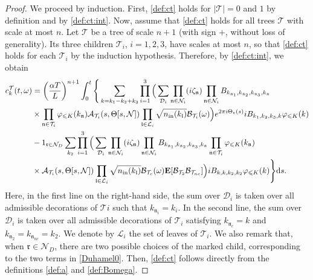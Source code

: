 \documentclass[UTF-8,reqno]{amsart}
\numberwithin{equation}{section}
\theoremstyle{definition}
\def\dif{{\mathord{{\rm d}}}}
\def\leq{\leqslant}
\def\dif{{\mathord{{\rm d}}}}
\def\leq{\leqslant}
\begin{document}
\begin{proof} We proceed by induction. First, \eqref{def:ct} holds for $|\mathcal{T}|=0$ and $1$ by definition and by \eqref{def:ct:int}.  Now, assume that \eqref{def:ct} holds for all trees $\mathcal{T}$ with scale at most $n$. Let $\mathcal{T}$ be a tree of scale $n+1$ (with sign $+$, without loss of generality). Its three children $\mathcal{T}_i$, $i=1,2,3$, have scales at most $n$, so that \eqref{def:ct} holds for each $\mathcal{T}_i$ by the induction hypothesis. Therefore, by \eqref{def:ct:int}, we obtain  
\begin{align}
c^{\mathcal{T}}_{k}(t,\omega)&=\bigg(\frac{\alpha T}{L}\bigg)^{n+1}\int_0^t \Bigg{\{}%
\sum_{k=k_1-k_2+k_3}\prod_{i=1}^3\Big{(}\sum_{\mathcal{D}_i}\prod_{\mathfrak{n}\in\mathcal{N}_i}(i\zeta_{\mathfrak{n}}%
)\prod_{\mathfrak{n}\in\mathcal{N}_i}B_{k_{\mathfrak{n}_1},k_{\mathfrak{n}_2},k_{\mathfrak{n}_3},k_{\mathfrak{n}}}\notag\\
&\times\prod_{\mathfrak{n}\in\mathcal{T}_i}\varphi_{\leq K}(k_\mathfrak{n})\mathcal{A}_{\mathcal{T}_i}(s,\Theta [s,\mathcal{N}])\prod_{\mathfrak{l}\in\mathcal{L}_i}\sqrt{n_{\mathrm{in}}(k_{\mathfrak{l}})}\mathcal{B}_{\mathcal{T}_i}(\omega)\Big{)}e^{2\pi i \Theta_{\mathfrak{r}}(s)}i%
B_{k_1 ,k_2 ,k_{3},k}\varphi_{\leq K}(k )\notag\\
&-1_{\mathfrak{r}\in\mathcal{N}_D}\sum_{k_2}
\prod_{i=1}^3\Big{(}\sum_{\mathcal{D}_i}\prod_{\mathfrak{n}\in\mathcal{N}_i}(i\zeta_{\mathfrak{n}}%
)\prod_{\mathfrak{n}\in\mathcal{N}_i}B_{k_{\mathfrak{n}_1},k_{\mathfrak{n}_2},k_{\mathfrak{n}_3},k_{\mathfrak{n}}}\prod_{\mathfrak{n}\in\mathcal{T}_i}\varphi_{\leq K}(k_\mathfrak{n})\notag\\
&\times\mathcal{A}_{\mathcal{T}_i}(s,\Theta [s,\mathcal{N}])\prod_{\mathfrak{l}\in\mathcal{L}_i}\sqrt{n_{\mathrm{in}}(k_{\mathfrak{l}})}\mathcal{B}_{\mathcal{T}_{c}}(\omega)\mathbf{E}[\mathcal{B}_{\mathcal{T}_{2}}\mathcal{B}_{\mathcal{T}_{nc}}]\Big{)} iB_{k ,k ,k_{2},k_{2}}\varphi_{\leq K}(k )\Bigg{\}}\dif s.\notag
\end{align}
Here, in the first line on the right-hand side, the sum over $\mathcal{D}_i$ is taken over all admissible decorations of $\mathcal{T}i$ such that $k_{\mathfrak{n}_i}=k_i$.
In the second line, the sum over $\mathcal{D}_i$ is taken over all admissible decorations of $\mathcal{T}_i$ satisfying $k_{\mathfrak{n}_c}=k$ and $k_{\mathfrak{n}_2}=k_{\mathfrak{n}_{nc}}=k_2$.
We denote by $\mathcal{L}_i$ the set of leaves of $\mathcal{T}_i$.
We also remark that, when $\mathfrak{r}\in\mathcal{N}_D$, there are two possible choices of the marked child, corresponding to the two terms in \eqref{Duhamel0}.
Then, \eqref{def:ct} follows directly from the definitions \eqref{def:a} and \eqref{def:Bomega}.

\end{proof}
\end{document}
